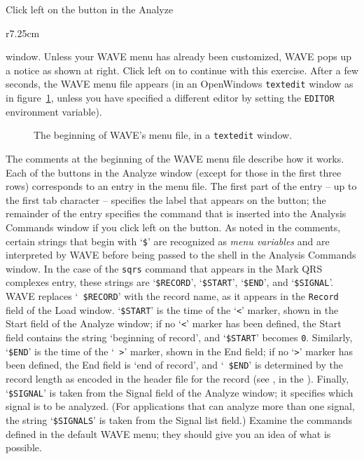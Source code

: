 \documentclass[twoside]{book}
\newcommand{\button}[1]{\cornersize{2}\ovalbox{\rule[-.3mm]{0cm}{2.5mm}\small\sf ~#1~}}
\newcommand{\WAVE}{{\sf WAVE}\xspace}
\begin{document}
Click left on the \button{Edit menu} button in the {\sf Analyze}
\begin{wrapfigure}[12]{r}{7.25cm}
\mbox{}
\end{wrapfigure}
window. Unless your \WAVE{} menu has already been customized, \WAVE{}
pops up a notice as shown at right.  Click left on \button{Copy} to
continue with this exercise.  After a few seconds, the \WAVE{} menu
file appears (in an OpenWindows {\tt textedit} window as in
figure~\ref{fig:wave-menu}, unless you have specified a different
editor by setting the {\tt EDITOR} environment variable).

\begin{figure}
\centerline{}
\caption[\WAVE{}'s menu file]{The beginning of \WAVE{}'s menu file, in
a {\tt textedit} window.}
\label{fig:wave-menu}
\end{figure}

The comments at the beginning of the \WAVE{} menu file describe how it
works.  Each of the buttons in the {\sf Analyze} window (except for
those in the first three rows) corresponds to an entry in the menu
file.  The first part of the entry -- up to the first tab character --
specifies the label that appears on the button; the remainder of the
entry specifies the command that is inserted into the {\sf Analysis
Commands} window if you click left on the button.  As noted in the
comments, certain strings that begin with `{\tt \$}' are recognized as
\index{variables!in \WAVE{} menu file}
\emph{menu variables} and are interpreted by \WAVE{} before being
passed to the shell in the {\sf Analysis Commands} window.  In the
case of the {\tt sqrs} command that appears in the {\sf Mark QRS
complexes} entry, these strings are `{\tt \$RECORD}', `{\tt \$START}',
`{\tt \$END}', and `{\tt \$SIGNAL}'.  \WAVE{} replaces `{\tt
\$RECORD}' with the record name, as it appears in the {\tt Record}
field of the {\sf Load} window.  `{\tt \$START}' is the time of the
`{\tt <}' marker, shown in the {\sf Start} field of the {\sf Analyze}
window; if no `{\tt <}' marker has been defined, the {\sf Start} field
contains the string `{\sf beginning of record}', and `{\tt \$START}'
becomes {\tt 0}.  Similarly, `{\tt \$END}' is the time of the `{\tt
>}' marker, shown in the {\sf End} field; if no `{\tt >}' marker has
been defined, the {\sf End} field is `{\sf end of record}', and `{\tt
\$END}' is determined by the record length as encoded in the header
file for the record (see
,
in the
).
Finally, `{\tt \$SIGNAL}' is taken from the
{\sf Signal} field of the {\sf Analyze} window; it specifies which
signal is to be analyzed.
(For applications that can analyze more than one signal,
the string `{\tt \$SIGNALS}' is taken from the {\sf Signal list}
field.)  Examine the commands defined in the default \WAVE{} menu;
they should give you an idea of what is possible.
\end{document}
